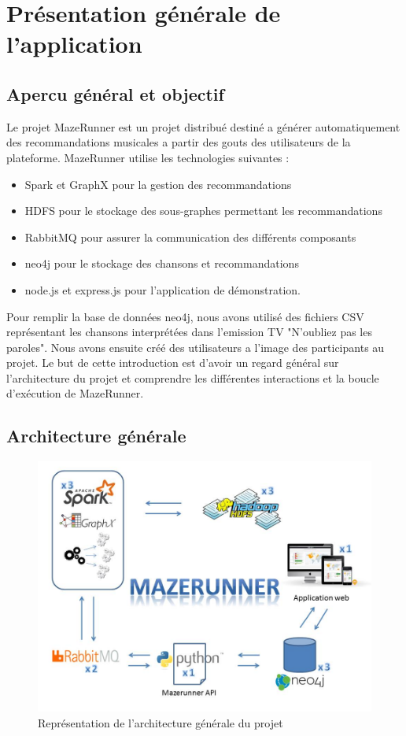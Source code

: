 \section{Présentation générale de l'application}

\subsection{Apercu général et objectif}

Le projet MazeRunner est un projet distribué destiné a générer automatiquement des recommandations musicales a partir des gouts des utilisateurs de la plateforme.
MazeRunner utilise les technologies suivantes :
\begin{itemize}
  \item Spark et GraphX pour la gestion des recommandations
  \item HDFS pour le stockage des sous-graphes permettant les recommandations
  \item RabbitMQ pour assurer la communication des différents composants
  \item neo4j pour le stockage des chansons et recommandations
  \item node.js et express.js pour l'application de démonstration.
\end{itemize}

Pour remplir la base de données neo4j, nous avons utilisé des fichiers CSV représentant les chansons interprétées dans l'emission TV "N'oubliez pas les paroles".
Nous avons ensuite créé des utilisateurs a l'image des participants au projet. Le but de cette introduction est d'avoir un regard général sur l'architecture du projet et comprendre les différentes interactions et la boucle d'exécution de MazeRunner.

\subsection{Architecture générale}

\begin{figure}[h]
    \centering
    \includegraphics[scale=0.7]{pics/schema_architecture_global.jpg}
    \caption{Représentation de l'architecture générale du projet}
\end{figure}
\FloatBarrier


